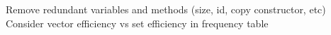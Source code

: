 Remove redundant variables and methods (size, id, copy constructor, etc) Consider vector efficiency vs set efficiency in frequency table 